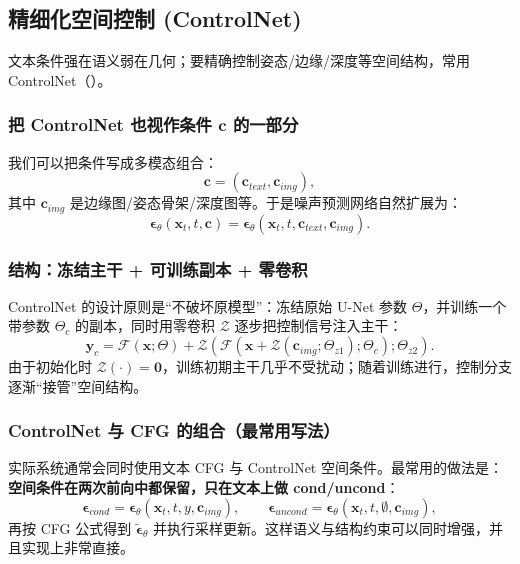 \documentclass[zihao=-4, fontset=windows]{ctexart}
\begin{document}
\subsection{精细化空间控制 (ControlNet)}

文本条件强在语义弱在几何；要精确控制姿态/边缘/深度等空间结构，常用 ControlNet（\cite{zhang2023adding}）。

\subsubsection{把 ControlNet 也视作条件 $\mathbf{c}$ 的一部分}
我们可以把条件写成多模态组合：
\begin{equation}
    \mathbf{c}=(\mathbf{c}_{text},\mathbf{c}_{img}),
\end{equation}
其中 $\mathbf{c}_{img}$ 是边缘图/姿态骨架/深度图等。于是噪声预测网络自然扩展为：
\begin{equation}
    \boldsymbol\epsilon_\theta(\mathbf{x}_t,t,\mathbf{c}) = \boldsymbol\epsilon_\theta(\mathbf{x}_t,t,\mathbf{c}_{text},\mathbf{c}_{img}).
\end{equation}

\subsubsection{结构：冻结主干 + 可训练副本 + 零卷积}
ControlNet 的设计原则是“不破坏原模型”：冻结原始 U-Net 参数 $\Theta$，并训练一个带参数 $\Theta_c$ 的副本，同时用零卷积 $\mathcal{Z}$ 逐步把控制信号注入主干：
\begin{equation}
    \mathbf{y}_c = \mathcal{F}(\mathbf{x};\Theta) + \mathcal{Z}(\mathcal{F}(\mathbf{x} + \mathcal{Z}(\mathbf{c}_{img};\Theta_{z1});\Theta_c);\Theta_{z2}).
\end{equation}
由于初始化时 $\mathcal{Z}(\cdot)=\mathbf{0}$，训练初期主干几乎不受扰动；随着训练进行，控制分支逐渐“接管”空间结构。

\subsubsection{ControlNet 与 CFG 的组合（最常用写法）}
实际系统通常会同时使用文本 CFG 与 ControlNet 空间条件。最常用的做法是：\textbf{空间条件在两次前向中都保留，只在文本上做 cond/uncond}：
\begin{equation}
    \boldsymbol\epsilon_{cond}=\boldsymbol\epsilon_\theta(\mathbf{x}_t,t, y,\mathbf{c}_{img}),\qquad
    \boldsymbol\epsilon_{uncond}=\boldsymbol\epsilon_\theta(\mathbf{x}_t,t, \emptyset,\mathbf{c}_{img}),
\end{equation}
再按 CFG 公式得到 $\tilde{\boldsymbol\epsilon}_\theta$ 并执行采样更新。这样语义与结构约束可以同时增强，并且实现上非常直接。
\end{document}
